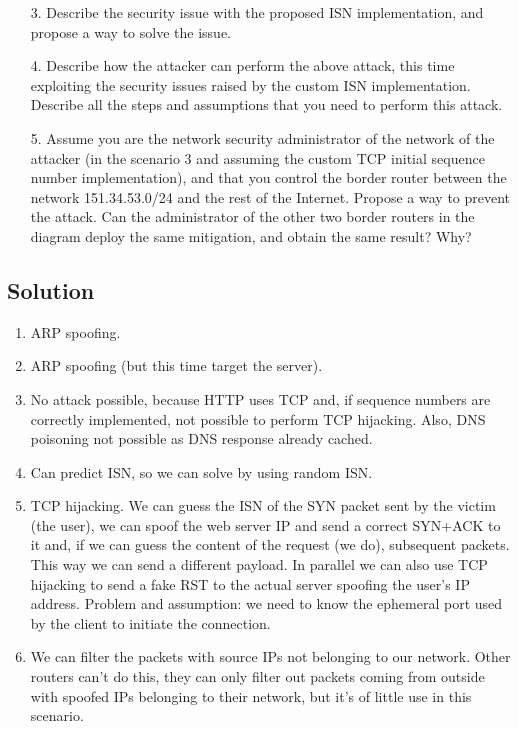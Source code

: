 \begin{enumerate}
    \item [3. ] Describe the security issue with the proposed ISN implementation, and propose a way to solve the issue. 
    \item [4. ] Describe how the attacker can perform the above attack, this time exploiting the security issues raised by the custom ISN implementation. 
        Describe all the steps and assumptions that you need to perform this attack.
    \item [5. ] Assume you are the network security administrator of the network of the attacker (in the scenario 3 and assuming the custom TCP initial sequence number implementation), and that you control the border router between the network 151.34.53.0/24 and the rest of the Internet.
        Propose a way to prevent the attack. 
        Can the administrator of the other two border routers in the diagram deploy the same mitigation, and obtain the same result? Why?
\end{enumerate}

\subsection*{Solution}
\begin{enumerate}
    \item ARP spoofing. 
    \item ARP spoofing (but this time target the server). 
    \item No attack possible, because HTTP uses TCP and, if sequence numbers are correctly implemented, not possible to perform TCP hijacking. 
        Also, DNS poisoning not possible as DNS response already cached.
    \item Can predict ISN, so we can solve by using random ISN. 
    \item TCP hijacking. 
        We can guess the ISN of the SYN packet sent by the victim (the user), we can spoof the web server IP and send a correct SYN+ACK to it and, if we can guess the content of the request (we do), subsequent packets. 
        This way we can send a different payload. 
        In parallel we can also use TCP hijacking to send a fake RST to the actual server spoofing the user's IP address.
        Problem and assumption: we need to know the ephemeral port used by the client to initiate the connection. 
    \item We can filter the packets with source IPs not belonging to our network.
        Other routers can't do this, they can only filter out packets coming from outside with spoofed IPs belonging to their network, but it's of little use in this scenario.
\end{enumerate}